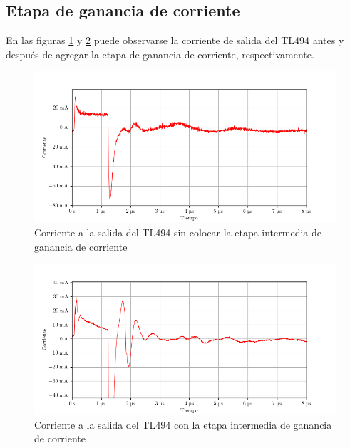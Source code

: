 


\subsection{Etapa de ganancia de corriente}

En las figuras \ref{fig:pwm_iout_sin_bjt} y \ref{fig:pwm_iout_con_bjt} puede observarse la corriente de salida del TL494 antes y después de agregar la etapa de ganancia de corriente, respectivamente.

\begin{figure}[H]
    \centering
    \includegraphics[width=\textwidth]{images/capturas-osciloscopio/TL494/pwm_iout_sin_bjt.png}
    \caption{Corriente a la salida del TL494 sin colocar la etapa intermedia de ganancia de corriente}
    \label{fig:pwm_iout_sin_bjt}
\end{figure}

\begin{figure}[H]
    \centering
    \includegraphics[width=\textwidth]{images/capturas-osciloscopio/BJT/bjt-iin-con-etapa.png}
    \caption{Corriente a la salida del TL494 con la etapa intermedia de ganancia de corriente}
    \label{fig:pwm_iout_con_bjt}
\end{figure}

